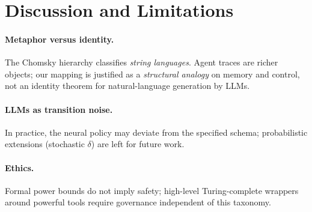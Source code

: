\section{Discussion and Limitations}

\paragraph{Metaphor versus identity.}
The Chomsky hierarchy classifies \emph{string languages}. Agent traces are richer objects; our mapping is justified as a \emph{structural analogy} on memory and control, not an identity theorem for natural-language generation by LLMs.

\paragraph{LLMs as transition noise.}
In practice, the neural policy may deviate from the specified schema; probabilistic extensions (stochastic $\delta$) are left for future work.

\paragraph{Ethics.}
Formal power bounds do not imply safety; high-level Turing-complete wrappers around powerful tools require governance independent of this taxonomy.
